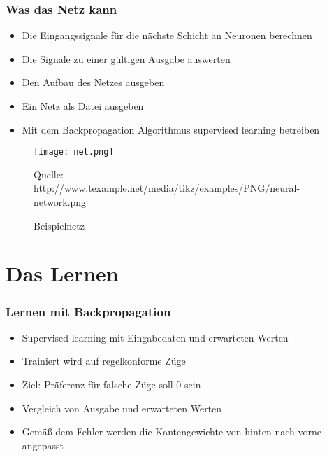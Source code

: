 \documentclass[compress]{beamer}
\begin{document}
\begin{frame}
	\frametitle{Was das Netz kann}
	
	\begin{itemize}
		\item Die Eingangssignale für die nächste Schicht an Neuronen berechnen
		\item Die Signale zu einer gültigen Ausgabe auswerten
		\item Den Aufbau des Netzes ausgeben
		\item Ein Netz als Datei ausgeben
		\item Mit dem Backpropagation Algorithmus supervised learning betreiben
	\end{itemize}
	
	\begin{figure}
		\begin{center}
			\texttt{[image: net.png]}
		\end{center}
		\caption{Beispielnetz}
		\begin{footnotesize}
		Quelle: http://www.texample.net/media/tikz/examples/PNG/neural-network.png
		\end{footnotesize}
		\label{fig:Netz}
	\end{figure}
	
\end{frame}

\section{Das Lernen}
\begin{frame}
	\frametitle{Lernen mit Backpropagation}
	
	\begin{itemize}
		\item Supervised learning mit Eingabedaten und erwarteten Werten
		\item Trainiert wird auf regelkonforme Züge
		\item Ziel: Präferenz für falsche Züge soll 0 sein
		\item Vergleich von Ausgabe und erwarteten Werten
		\item Gemäß dem Fehler werden die Kantengewichte von hinten nach vorne angepasst
	\end{itemize}
\end{frame}
\end{document}
